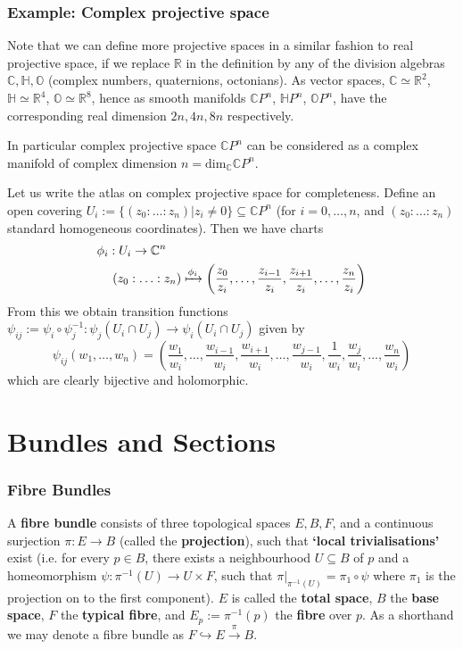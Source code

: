 \documentclass[a4paper]{article}
\theoremstyle{definition} \newtheorem*{definition}{Definition}
\theoremstyle{definition} \newtheorem*{definitions}{Definitions}
\theoremstyle{plain} \newtheorem{theorem}{Theorem}[section]
\theoremstyle{plain} \newtheorem{proposition}[theorem]{Proposition}
\theoremstyle{plain} \newtheorem{corollary}[theorem]{Corollary}
\theoremstyle{plain} \newtheorem{lemma}[theorem]{Lemma}
\theoremstyle{plain} \newtheorem{example}[theorem]{Example}
\newcommand{\defn}[1]{\textbf{#1}}
\newcommand{\realnos}{\mathbb{R}}
\newcommand{\complexnos}{\mathbb{C}}
\newcommand{\projCspace}{\complexnos P^n}
\begin{document}
\subsubsection{Example: Complex projective space}

Note that we can define more projective spaces in a similar fashion to real projective space, if we replace $\realnos$ in the definition by any of the division algebras $\complexnos, \mathbb{H}, \mathbb{O}$ (complex numbers, quaternions, octonians). As vector spaces, $\complexnos \simeq \realnos^2$, $\mathbb{H} \simeq \realnos^4$, $\mathbb{O} \simeq \realnos^8$, hence as smooth manifolds $\complexnos P^n$, $\mathbb{H}P^n$, $\mathbb{O}P^n$, have the corresponding real dimension $2n, 4n, 8n$ respectively.

In particular complex projective space $\complexnos P^n$ can be considered as a complex manifold of complex dimension $n=\text{dim}_\complexnos \complexnos P^n$. 

Let us write the atlas on complex projective space for completeness. Define an open covering $U_i:=\{(z_0:\ldots :z_n)| z_i\neq 0\}\subseteq \projCspace$ (for $i=0,\ldots, n$, and $(z_0:\ldots :z_n)$ standard homogeneous coordinates). Then we have charts
\begin{align*}
\phi_i & :U_i \to \complexnos^n \\
& \ (z_0:\ldots : z_n) \xmapsto{\phi_i} \left( \frac{z_0}{z_i}, \ldots, \frac{z_{i-1}}{z_i}, \frac{z_{i+1}}{z_i}, \ldots, \frac{z_n}{z_i} \right)
\end{align*}
From this we obtain transition functions $\psi_{ij}:=\psi_i\circ \psi_j^{-1}:\psi_j(U_i\cap U_j)\to \psi_i(U_i\cap U_j)$ given by
$$\psi_{ij}(w_1, \ldots, w_n) = \left( \frac{w_1}{w_i}, \ldots, \frac{w_{i-1}}{w_i}, \frac{w_{i+1}}{w_i}, \ldots, \frac{w_{j-1}}{w_i}, \frac{1}{w_i}, \frac{w_j}{w_i}, \ldots, \frac{w_n}{w_i} \right)$$
which are clearly bijective and holomorphic.

\section{Bundles and Sections}

\subsubsection{Fibre Bundles}

A \defn{fibre bundle} consists of three topological spaces $E, B, F$, and a continuous surjection $\pi:E\rightarrow B$ (called the \defn{projection}), such that \defn{`local trivialisations'} exist (i.e. for every $p\in B$, there exists a neighbourhood $U\subseteq B$ of $p$ and a homeomorphism $\psi: \pi^{-1}(U) \rightarrow U \times F$, such that $\pi \vert_{\pi^{-1}(U)} = \pi_1 \circ \psi$ where $\pi_1$ is the projection on to the first component). $E$ is called the \defn{total space}, $B$ the \defn{base space}, $F$ the \defn{typical fibre}, and $E_p:=\pi^{-1}(p)$ the \defn{fibre} over $p$. As a shorthand we may denote a fibre bundle as $F\hookrightarrow E\xrightarrow{\pi} B$.
\end{document}
